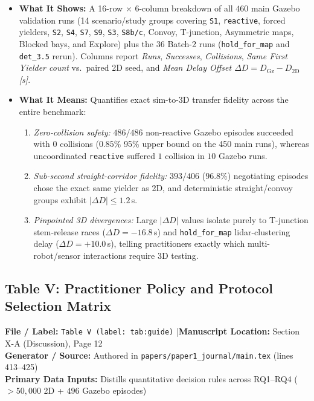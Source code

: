 \documentclass[10pt,a4paper]{article}
\newcommand{\meta}[4]{%
  \vspace{2pt}%
  \noindent\colorbox{BoxBg}{%
    \parbox{\dimexpr\textwidth-2\fboxsep\relax}{%
      \footnotesize\raggedright
      \textbf{File / Label:} \texttt{#1} \quad|\quad \textbf{Manuscript Location:} #2\\[1pt]
      \textbf{Generator / Source:} #3\\[1pt]
      \textbf{Primary Data Inputs:} #4%
    }%
  }\par\vspace{4pt}%
}
\begin{document}
\begin{itemize}
  \item \textbf{What It Shows:} A 16-row $\times$ 6-column breakdown of all $460$ main Gazebo validation runs (14 scenario/study groups covering \texttt{S1}, \texttt{reactive}, forced yielders, \texttt{S2}, \texttt{S4}, \texttt{S7}, \texttt{S9}, \texttt{S3}, \texttt{S8b/c}, Convoy, T-junction, Asymmetric maps, Blocked bays, and Explore) plus the $36$ Batch-2 runs (\texttt{hold\_for\_map} and \texttt{det\_3.5} rerun). Columns report \emph{Runs}, \emph{Successes}, \emph{Collisions}, \emph{Same First Yielder count} vs.\ paired 2D seed, and \emph{Mean Delay Offset $\Delta D = D_{\mathrm{Gz}} - D_{\mathrm{2D}}$ [s]}.
  \item \textbf{What It Means:} Quantifies exact sim-to-3D transfer fidelity across the entire benchmark:
  \begin{enumerate}[leftmargin=1.6em,itemsep=1pt,topsep=1pt]
    \item \emph{Zero-collision safety:} $486/486$ non-reactive Gazebo episodes succeeded with $0$ collisions ($0.85\%$ 95\% upper bound on the 450 main runs), whereas uncoordinated \texttt{reactive} suffered $1$ collision in $10$ Gazebo runs.
    \item \emph{Sub-second straight-corridor fidelity:} $393/406$ ($96.8\%$) negotiating episodes chose the exact same yielder as 2D, and deterministic straight/convoy groups exhibit $|\Delta D| \le 1.2$\,s.
    \item \emph{Pinpointed 3D divergences:} Large $|\Delta D|$ values isolate purely to T-junction stem-release races ($\Delta D = -16.8$\,s) and \texttt{hold\_for\_map} lidar-clustering delay ($\Delta D = +10.0$\,s), telling practitioners exactly which multi-robot/sensor interactions require 3D testing.
  \end{enumerate}
\end{itemize}

\subsection{Table V: Practitioner Policy and Protocol Selection Matrix}

\meta{Table V (label: tab:guide)}{Section X-A (Discussion), Page 12}{Authored in \texttt{papers/paper1\_journal/main.tex} (lines 413--425)}{Distills quantitative decision rules across RQ1--RQ4 ($>50{,}000$ 2D + $496$ Gazebo episodes)}
\end{document}
